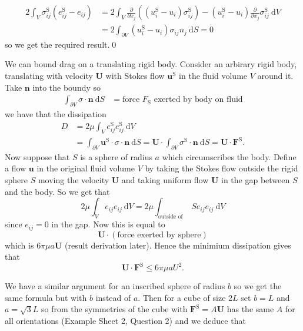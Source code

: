 \documentclass{article}
\begin{document}
\begin{align*}
	2\int_V \sigma_{ij}^{\mathrm S}(e_{ij}^{\mathrm S} - e_{ij}) &= 2\int_V \frac{\partial}{\partial x_j}((u_i^{\mathrm S} - u_i) \sigma_{ij}^{\mathrm S}) - (u_i^{\mathrm S} - u_i)\frac{\partial}{\partial x_j}\sigma_{ij}^{\mathrm S} \ \mathrm dV \\
								     &= 2\int_{\partial V} (u_i^{\mathrm S} - u_i)\sigma_{ij}n_j \ \mathrm dS = 0
\end{align*}
so we get the required result.\qed
\begin{example}
	We can bound drag on a translating rigid body. Consider an arbirary rigid body, translating with velocity $ \mathbf U $ with Stokes flow $ \mathbf u^{\mathrm S} $ in the fluid volume $ V $ around it. Take $ \mathbf n $ into the boundy so 
	\begin{align*}
		\int_{\partial V} \sigma\cdot\mathbf n \ \mathrm dS&= \text{force } F_{\mathrm S} \text{ exerted by body on fluid}
	\end{align*}
 we have that the dissipation
	\begin{align*}
		D &= 2\mu \int_V e^{\mathrm S}_{ij}e^{\mathrm S}_{ij} \ \mathrm dV \\
		  &= \int_{\partial V} \mathbf u^{\mathrm S} \cdot\sigma\cdot\mathbf n  \ \mathrm dS = \mathbf U \cdot \int_{\partial V} \sigma^{\mathrm S}\cdot \mathbf n \ \mathrm dS = \mathbf U \cdot \mathbf F^{\mathrm S}.
	\end{align*}
	Now suppose that $ S $ is a sphere of radius $ a $ which circumscribes the body. Define a flow $ \mathbf u $ in the original fluid volume $ V $ by taking the Stokes flow outside the rigid sphere $ S $ moving the velocity $ \mathbf U $ and taking uniform flow $ \mathbf U $ in the gap between $ S $ and the body. So we get that
	\[
		2\mu \int_V e_{ij}e_{ij} \ \mathrm dV = 2\mu \int_{\text{outside of }} S e_{ij}e_{ij} \ \mathrm dV
	\]
	since $ e_{ij} = 0 $ in the gap. Now this is equal to
	\[
		\mathbf U \cdot (\text{force exerted by sphere})
	\]
	which is $ 6\pi \mu a \mathbf U $ (result derivation later). Hence the minimium dissipation gives that
	\[
		\mathbf U \cdot\mathbf F^{\mathrm S} \le 6\pi \mu aU^2.
	\]

\end{example}
We have a similar argument for an inscribed sphere of radius $ b $ so we get the same formula but with $ b $ instead of $ a $. Then for a cube of size $ 2L $ set $ b =L $ and $ a =\sqrt 3 L $ so from the symmetries of the cube with $ \mathbf F^{\mathrm S} = A\mathbf U $ has the same $ A $ for all orientations (Example Sheet 2, Question 2) and we deduce that
\end{document}
